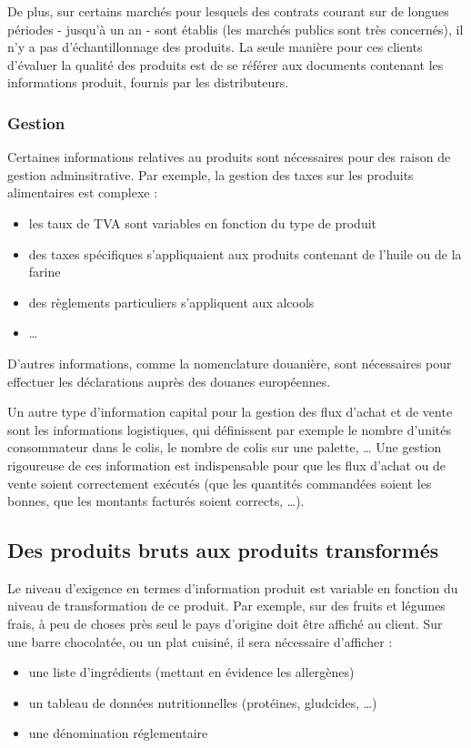                 De plus, sur certains marchés pour lesquels des contrats courant sur de longues périodes - jusqu'à un an - sont établis (les marchés publics sont très concernés), il n'y a pas d'échantillonnage des produits.
                La seule manière pour ces clients d'évaluer la qualité des produits est de se référer aux documents contenant les informations produit, fournis par les distributeurs.

                \subsubsection{Gestion}

                Certaines informations relatives au produits sont nécessaires pour des raison de gestion adminsitrative.
                Par exemple, la gestion des taxes sur les produits alimentaires est complexe : 
                \begin{itemize}
                    \item les taux de TVA sont variables en fonction du type de produit
                    \item des taxes spécifiques s'appliquaient aux produits contenant de l'huile ou de la farine
                    \item des règlements particuliers s'appliquent aux alcools
                    \item \dots
                \end{itemize}
                D'autres informations, comme la nomenclature douanière, sont nécessaires pour effectuer les déclarations auprès des douanes européennes.

                Un autre type d'information capital pour la gestion des flux d'achat et de vente sont les informations logistiques, qui définissent par exemple le nombre d'unités consommateur dans le colis, le nombre de colis sur une palette, \dots
                Une gestion rigoureuse de ces information est indispensable pour que les flux d'achat ou de vente soient correctement exécutés (que les quantités commandées soient les bonnes, que les montants facturés soient corrects, \dots).

            \subsection{Des produits bruts aux produits transformés}

            Le niveau d'exigence en termes d'information produit est variable en fonction du niveau de transformation de ce produit.
            Par exemple, sur des fruits et légumes frais, à peu de choses près seul le pays d'origine doit être affiché au client.
            Sur une barre chocolatée, ou un plat cuisiné, il sera nécessaire d'afficher :
            \begin{itemize}
                 \item une liste d'ingrédients (mettant en évidence les allergènes)
                 \item un tableau de données nutritionnelles (protéines, gludcides, \dots)
                 \item une dénomination réglementaire
            \end{itemize}

